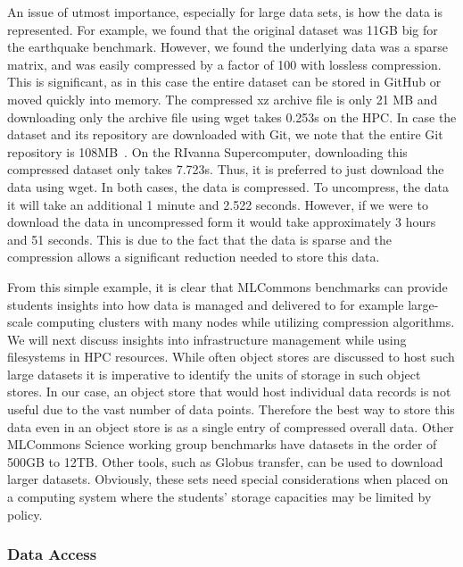 \documentclass[utf8]{FrontiersinVancouver} %
\begin{document}
An issue of utmost importance, especially for large data sets, is how the data is represented. For example, we found that the original dataset was 11GB big for the earthquake benchmark. However, we found the underlying data was a sparse matrix, and was easily compressed by a factor of 100 with lossless compression. This is significant, as in this case the entire dataset can be stored in GitHub or moved quickly into memory. The compressed xz archive file is only 21 MB and downloading only the archive file using wget takes 0.253s on the HPC. In case the dataset and its repository are downloaded with Git, we note that the entire Git repository is 108MB~\citep{eq-data}. On the RIvanna Supercomputer, downloading this compressed dataset only takes 7.723s. Thus, it is preferred to just download the data using wget. In both cases, the data is compressed. To uncompress, the data it will take an additional 1 minute and 2.522 seconds. However, if we were to download the data in uncompressed form it would take approximately 3 hours and 51 seconds. This is due to the fact that the data is sparse and the compression allows a significant reduction needed to store this data.

From this simple example, it is clear that MLCommons benchmarks can provide students insights into how data is managed and delivered to for example large-scale computing clusters with many nodes while utilizing compression algorithms. We will next discuss insights into infrastructure management while using filesystems in HPC resources.  While often object stores are discussed to host such large datasets it is imperative to identify the units of storage in such object stores.  In our case, an object store that would host individual data records is not useful due to the vast number of data points. Therefore the best way to store this data even in an object store is as a single entry of compressed overall data.  Other MLCommons Science working group benchmarks have datasets in the order of 500GB to 12TB. Other tools, such as Globus transfer, can be used to download larger datasets.  Obviously, these sets need special considerations when placed on a computing system where the students' storage capacities may be limited by policy.


\subsubsection{Data Access}
\end{document}
